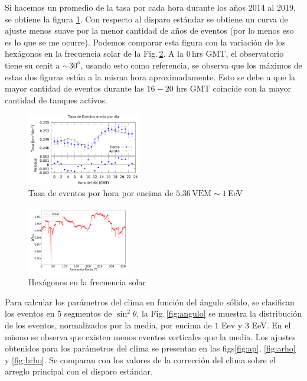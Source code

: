 Si hacemos un promedio de la tasa por cada hora durante los años 2014 al 2019, se obtiene la figura \ref{fig:hora}. Con respecto al disparo estándar se obtiene un curva de ajuste menos suave por la menor cantidad de años de eventos (por lo menos eso es lo que se me ocurre). Podemos comparar esta figura con la variación de los hexágonos en la frecuencia solar de la Fig.\,\ref{fig:pesos_solar}. A la $0$\,hrs GMT, el observatorio tiene su cenit a $\sim 30^o$, usando esto como referencia,  se observa que los máximos de estas dos figuras están a la misma hora aproximadamente. Esto se debe a que la mayor cantidad de eventos durante  las $16 - 20$ hrs GMT coincide con la mayor cantidad de tanques activos.
\begin{figure}[H]
	\centering
	\includegraphics[width=0.45\textwidth]{figura_tasa_por_hora_del_dia.png}
	\caption{Tasa de eventos por hora por encima de  $5.36\, \text{VEM} \sim 1 $\,EeV}
	\label{fig:hora}
\end{figure}

\begin{figure}[H]
	\centering
	\includegraphics[width=0.4\textwidth]{figura_hexagonos_solar.pdf}
	\caption{Hexágonos en la frecuencia  solar}
	\label{fig:pesos_solar}
\end{figure}

Para  calcular los parámetros del clima en función del ángulo sólido, se clasifican los eventos en 5 segmentos de $\sin^2\theta$, la Fig.\,\ref{fig:angulo} se muestra la distribución de los eventos, normalizados por la media, por encima de $1$ Eev y $3$ EeV. En el mismo se observa que existen menos eventos verticales que la media. Los ajustes  obtenidos para los parámetros del clima se presentan en las figs\ref{fig:ap}, \ref{fig:arho} y \ref{fig:brho}. Se comparan con los valores de la corrección del clima sobre el arreglo principal con el disparo estándar.

